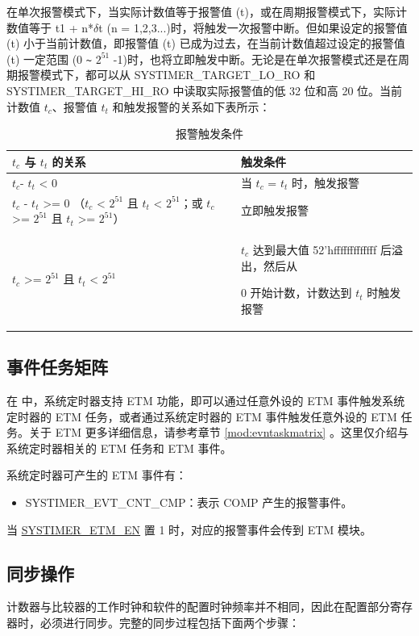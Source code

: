 \documentclass[main\_\_CN.tex]{subfiles}
\begin{document}
在单次报警模式下，当实际计数值等于报警值 (t)，或在周期报警模式下，实际计数值等于 t1 + n*$\delta$t (n = 1,2,3...)时，将触发一次报警中断。但如果设定的报警值 (t) 小于当前计数值，即报警值 (t) 已成为过去，在当前计数值超过设定的报警值 (t) 一定范围 (0 \verb+~+ $2^{51}$ -1)时，也将立即触发中断。无论是在单次报警模式还是在周期报警模式下，都可以从 SYSTIMER\_TARGET\_LO\_RO 和 SYSTIMER\_TARGET\_HI\_RO 中读取实际报警值的低 32 位和高 20 位。当前计数值 $t_{c}$、报警值 $t_{t}$ 和触发报警的关系如下表所示：

\begin{longtable}[c]{ | p{4cm} | p{6.5cm} |}
\caption{报警触发条件}
\\\hline
\rowcolor{lightgray}
\textbf{$t_{c}$ 与 $t_{t}$ 的关系}  & \textbf{触发条件} \\ \hline
$t_{c}$- $t_{t}$ < 0 & 当 $t_{c}$ = $t_{t}$ 时，触发报警\\ \hline
$t_{c}$ - $t_{t}$ >= 0 \newline（$t_{c}$ < $2^{51}$ 且 $t_{t}$ < $2^{51}$；\newline 或 $t_{c}$ >= $2^{51}$ 且 $t_{t}$ >= $2^{51}$）& 立即触发报警\\ \hline
\multirow{2}{*}{$t_{c}$ >= $2^{51}$ 且 $t_{t}$ < $2^{51}$} & $t_{c}$ 达到最大值 52'hfffffffffffff 后溢出，然后从

0 开始计数，计数达到 $t_{t}$ 时触发报警 \\ \hline
\end{longtable}

\subsection{事件任务矩阵}
在 \chipname{} 中，系统定时器支持 ETM 功能，即可以通过任意外设的 ETM 事件触发系统定时器的 ETM 任务，或者通过系统定时器的 ETM 事件触发任意外设的 ETM 任务。关于 ETM 更多详细信息，请参考章节 \ref{mod:evntaskmatrix} 。这里仅介绍与系统定时器相关的 ETM 任务和 ETM 事件。

系统定时器可产生的 ETM 事件有：

\begin{itemize}
\item SYSTIMER\_EVT\_CNT\_CMP：表示 COMP 产生的报警事件。
\end{itemize}

当 \hyperref[fielddesc:SYSTIMERETMEN]{SYSTIMER\_ETM\_EN} 置 1 时，对应的报警事件会传到 ETM 模块。

\subsection{同步操作}
计数器与比较器的工作时钟和软件的配置时钟频率并不相同，因此在配置部分寄存器时，必须进行同步。完整的同步过程包括下面两个步骤：
\end{document}
